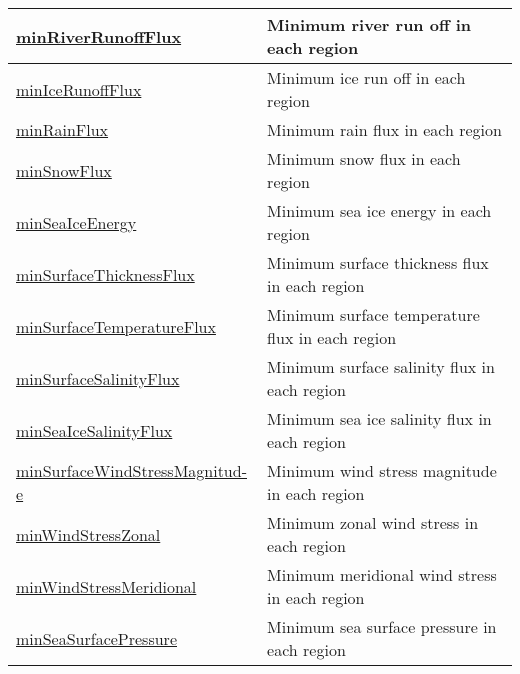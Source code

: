 {\begin{center}
\begin{longtable}{| p{2.0in} | p{4.0in} |}
    \hline
    \hyperref[subsec:var_sec_surfaceAreaWeightedAveragesAM_minRiverRunoffFlux]{minRiverRunoffFlux} & Minimum river run off in each region \\
    \hline
    \hyperref[subsec:var_sec_surfaceAreaWeightedAveragesAM_minIceRunoffFlux]{minIceRunoffFlux} & Minimum ice run off in each region \\
    \hline
    \hyperref[subsec:var_sec_surfaceAreaWeightedAveragesAM_minRainFlux]{minRainFlux} & Minimum rain flux in each region \\
    \hline
    \hyperref[subsec:var_sec_surfaceAreaWeightedAveragesAM_minSnowFlux]{minSnowFlux} & Minimum snow flux in each region \\
    \hline
    \hyperref[subsec:var_sec_surfaceAreaWeightedAveragesAM_minSeaIceEnergy]{minSeaIceEnergy} & Minimum sea ice energy in each region \\
    \hline
    \hyperref[subsec:var_sec_surfaceAreaWeightedAveragesAM_minSurfaceThicknessFlux]{minSurfaceThicknessFlux} & Minimum surface thickness flux in each region \\
    \hline
    \hyperref[subsec:var_sec_surfaceAreaWeightedAveragesAM_minSurfaceTemperatureFlux]{minSurfaceTemperatureFlux} & Minimum surface temperature flux in each region \\
    \hline
    \hyperref[subsec:var_sec_surfaceAreaWeightedAveragesAM_minSurfaceSalinityFlux]{minSurfaceSalinityFlux} & Minimum surface salinity flux in each region \\
    \hline
    \hyperref[subsec:var_sec_surfaceAreaWeightedAveragesAM_minSeaIceSalinityFlux]{minSeaIceSalinityFlux} & Minimum sea ice salinity flux in each region \\
    \hline
    \hyperref[subsec:var_sec_surfaceAreaWeightedAveragesAM_minSurfaceWindStressMagnitude]{minSurfaceWindStressMagnitud-}\hyperref[subsec:var_sec_surfaceAreaWeightedAveragesAM_minSurfaceWindStressMagnitude]{e}  & Minimum wind stress magnitude in each region \\
    \hline
    \hyperref[subsec:var_sec_surfaceAreaWeightedAveragesAM_minWindStressZonal]{minWindStressZonal} & Minimum zonal wind stress in each region \\
    \hline
    \hyperref[subsec:var_sec_surfaceAreaWeightedAveragesAM_minWindStressMeridional]{minWindStressMeridional} & Minimum meridional wind stress in each region \\
    \hline
    \hyperref[subsec:var_sec_surfaceAreaWeightedAveragesAM_minSeaSurfacePressure]{minSeaSurfacePressure} & Minimum sea surface pressure in each region \\

\end{longtable}
\end{center}}
